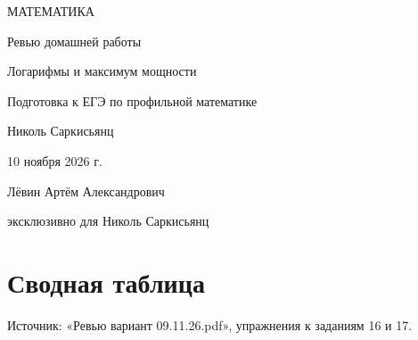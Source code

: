 \documentclass[a4paper,12pt]{article}
\begin{document}
\thispagestyle{empty}
\begin{center}
\vspace*{28mm}
{\color{darkaccent}\large МАТЕМАТИКА}\par\vspace{15mm}
{\Huge Ревью домашней работы}\par\vspace{11mm}
{\fontsize{17}{23}\selectfont\color{accent}Логарифмы и максимум мощности}\par\vspace{15mm}
{\small Подготовка к ЕГЭ по профильной математике}\par
\vfill
{\normalsize Николь Саркисьянц}\par\vspace{8mm}
{\normalsize 10 ноября 2026 г.}\par\vspace{12mm}
{\small Лёвин Артём Александрович}\par
{\small эксклюзивно для Николь Саркисьянц}\par\vspace{12mm}
\end{center}
\clearpage
\section*{Сводная таблица}
\textcolor{darkaccent}{Источник:} «Ревью вариант 09.11.26.pdf», упражнения к заданиям 16 и 17.
\end{document}
